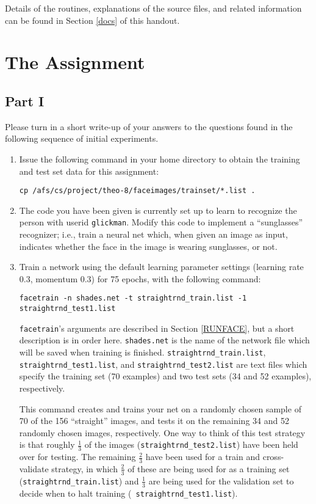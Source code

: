 Details of the routines, explanations of the source files, and related
information can be found in Section \ref{docs} of this handout.

\section{The Assignment}

\subsection{Part I}

Please turn in a short write-up of your answers to the questions found
in the following sequence of initial experiments.

\begin{enumerate}

\item Issue the following command in your home directory to obtain
the training and test set data for this assignment:

{\tt cp /afs/cs/project/theo-8/faceimages/trainset/*.list .}

\item The code you have been given is currently set up to learn to recognize
the person with userid {\tt glickman}.  Modify this code to implement a
``sunglasses'' recognizer; i.e., train a neural net which, when given an image
as input, indicates whether the face in the image is wearing sunglasses, or
not.

\item Train a network using the default learning parameter settings (learning
rate 0.3, momentum 0.3) for 75 epochs, with the following command:

{\tt facetrain -n shades.net -t straightrnd\_train.list -1 straightrnd\_test1.list}

{\tt facetrain}'s arguments are described in Section \ref{RUNFACE},
but a short description is in order here.  {\tt shades.net} is the name of
the network file which will be saved when training is finished.
{\tt straightrnd\_train.list}, {\tt straightrnd\_test1.list}, and
{\tt straightrnd\_test2.list} are text files which specify the training
set (70 examples) and two test sets (34 and 52 examples), respectively.

This command creates and trains your net on a randomly chosen sample of 70 of
the 156 ``straight'' images, and tests it on the remaining 34 and 52 randomly
chosen images, respectively.  One way to think of this test strategy is that
roughly $\frac{1}{3}$ of the images ({\tt straightrnd\_test2.list}) have been
held over for testing.  The remaining $\frac{2}{3}$ have been used for a train
and cross-validate strategy, in which $\frac{2}{3}$ of these are being used
for as a training set ({\tt straightrnd\_train.list}) and $\frac{1}{3}$ are
being used for the validation set to decide when to halt training ({\tt
straightrnd\_test1.list}).


\end{enumerate}
